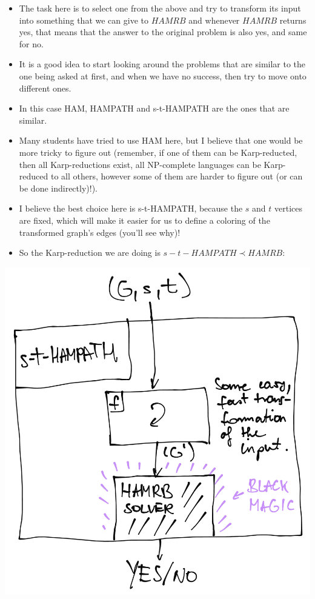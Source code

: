 \begin{itemize}
    \item The task here is to select one from the above and try to transform its input into something that we can give to $HAMRB$ and whenever $HAMRB$ returns yes, that means that the answer to the original problem is also yes, and same for no.
    \item It is a good idea to start looking around the problems that are similar to the one being asked at first, and when we have no success, then try to move onto different ones.
    \item In this case HAM, HAMPATH and s-t-HAMPATH are the ones that are similar.
    \item Many students have tried to use HAM here, but I believe that one would be more tricky to figure out (remember, if one of them can be Karp-reducted, then all Karp-reductions exist, all NP-complete languages can be Karp-reduced to all others, however some of them are harder to figure out (or can be done indirectly)!).
    \item I believe the best choice here is s-t-HAMPATH, because the $s$ and $t$ vertices are fixed, which will make it easier for us to define a coloring of the transformed graph's edges (you'll see why)!
    \item So the Karp-reduction we are doing is $s-t-HAMPATH \prec HAMRB$:
\end{itemize}

\begin{center}
\includegraphics[width=0.9\linewidth]{./exams/2022_05_30/03/sthampath_hamrb_karp.png}
\end{center}

